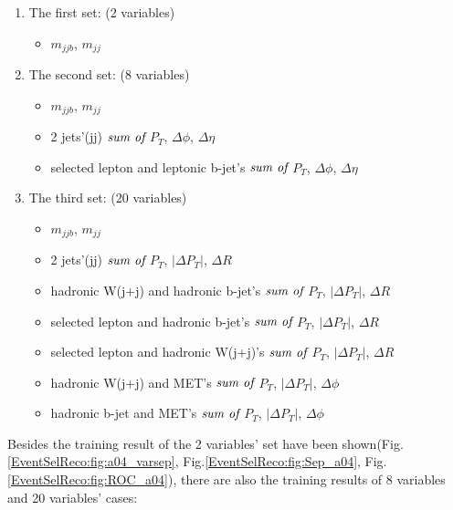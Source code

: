 			\begin{enumerate}
			\item The first set: (2 variables)
				\begin{itemize}
				\item $m_{jjb}$, $m_{jj}$
				\end{itemize}

			\item The second set: (8 variables)
				\begin{itemize}
				\item $m_{jjb}$, $m_{jj}$
				\item 2 jets'(jj) $\emph{sum of}$ $P_{T}$, $\Delta \phi$, $\Delta \eta$
				\item selected lepton and leptonic b-jet's $\emph{sum of}$ $P_{T}$, $\Delta \phi$, $\Delta \eta$ 
				\end{itemize}

			\item The third set: (20 variables)
				\begin{itemize}
				\item $m_{jjb}$, $m_{jj}$
				\item 2 jets'(jj) $\emph{sum of}$ $P_{T}$, $|\Delta P_{T}|$, $\Delta R$
				\item hadronic W(j+j) and hadronic b-jet's $\emph{sum of}$ $P_{T}$, $|\Delta P_{T}|$, $\Delta R$
				\item selected lepton and hadronic b-jet's $\emph{sum of}$ $P_{T}$, $|\Delta P_{T}|$, $\Delta R$
				\item selected lepton and hadronic W(j+j)'s $\emph{sum of}$ $P_{T}$, $|\Delta P_{T}|$, $\Delta R$
				\item hadronic W(j+j) and MET's $\emph{sum of}$ $P_{T}$, $|\Delta P_{T}|$, $\Delta \phi$
				\item hadronic b-jet and MET's $\emph{sum of}$ $P_{T}$, $|\Delta P_{T}|$, $\Delta \phi$
				\end{itemize}
			\label{EventSelReco:itm:mva_var}
			\end{enumerate}

			Besides the training result of the 2 variables' set have been shown(Fig.\ref{EventSelReco:fig:a04_varsep}, Fig.\ref{EventSelReco:fig:Sep_a04}, Fig.\ref{EventSelReco:fig:ROC_a04}), there are also the training results of 8 variables and 20 variables' cases:

